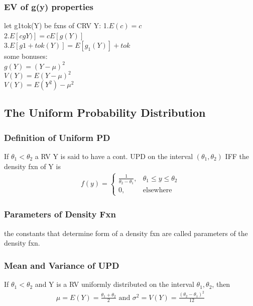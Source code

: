 \documentclass[12pt]{article}
\begin{document}
    \subsubsection{EV of g(y) properties}
        let g1tok(Y) be fxns of CRV Y:
        1.$ E(c) = c $\\
        2.$ E[cgY)]= cE[g(Y)] $\\
        3.$ E[g1+tok(Y)] = E[g_{1}(Y)]+tok$\\
        some bonuses:\\
        $ g(Y) = (Y -\mu )^2  $\\
        $ V(Y) = E(Y-\mu)^2  $ \\
        $ V(Y) = E(Y^2 )-\mu ^2  $
\subsection{The Uniform Probability Distribution}
    \subsubsection{Definition of Uniform PD}
        If $ \theta_{1} < \theta _{2} $ a RV Y is said to have a cont.
        UPD on the interval $ (\theta _{1},\theta _{2}) $ IFF the density
        fxn of Y is 
        \begin{align*}
            f(y) = 
            \begin{cases}
                \frac{1}{\theta _{2}-\theta _{1}}, & 
                \theta _{1} \le y \le \theta _{2} \\
                0, & \text{elsewhere}
            \end{cases}
        \end{align*}
    \subsubsection{Parameters of Density Fxn}
        the constants that determine form of a density fxn are called
        parameters of the density fxn.
    \subsubsection{Mean and Variance of UPD}
        If $ \theta _{1}<\theta _{2} $ and Y is a RV uniformly distributed on
        the interval $ \theta _{1}, \theta _{2} $, then
        \begin{align*}
            \mu = E(Y) = \frac{\theta _{1}+ \theta _{2}}{2} \text{ and } 
            \sigma ^2  = V(Y) = \frac{(\theta _{2}-\theta _{1})^2 }{12} 
        \end{align*}
\end{document}
